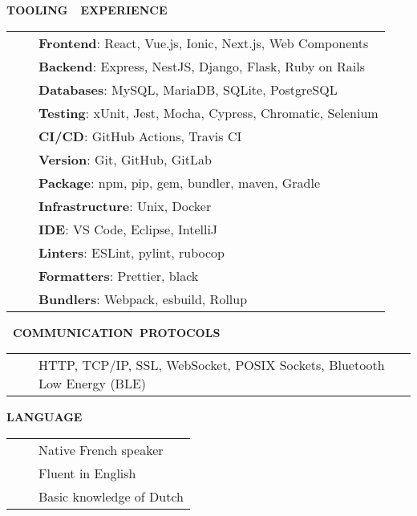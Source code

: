 \documentclass[a4paper,11pt,english]{article}
\newcommand{\LeftColumn}[0]{6.0cm}
\newcommand{\ToolCategory}[1]{\textbf{#1}}
\newcommand{\Bullet}[0]{\faCaretRight~~}
\newcommand{\Rubric}[1]{\colorbox{gray!20}{\parbox{\linewidth}{\centering\sffamily\bfseries{}#1}}}
\begin{document}
\begin{minipage}[t]{\LeftColumn}

\Rubric{\faTools \quad TOOLING~~EXPERIENCE}\vspace{8pt}

\begin{tabularx}{\linewidth}{@{}l@{}>{\raggedright\arraybackslash}X@{}}
\Bullet & \ToolCategory{Frontend}: React, Vue.js, Ionic, Next.js, Web Components \\[0pt]
\Bullet & \ToolCategory{Backend}: Express, NestJS, Django, Flask, Ruby on Rails \\[0pt]
\Bullet & \ToolCategory{Databases}: MySQL, MariaDB, SQLite, PostgreSQL \\[0pt]
\Bullet & \ToolCategory{Testing}: xUnit, Jest, Mocha, Cypress, Chromatic, Selenium \\[0pt]
\Bullet & \ToolCategory{CI/CD}:  GitHub Actions, Travis CI \\[0pt]
\Bullet & \ToolCategory{Version}: Git, GitHub, GitLab \\[0pt]
\Bullet & \ToolCategory{Package}: npm, pip, gem, bundler, maven, Gradle \\[0pt]
\Bullet & \ToolCategory{Infrastructure}: Unix, Docker \\[0pt]
\Bullet & \ToolCategory{IDE}: VS Code, Eclipse, IntelliJ \\[0pt]
\Bullet & \ToolCategory{Linters}: ESLint, pylint, rubocop \\[0pt]
\Bullet & \ToolCategory{Formatters}: Prettier, black \\[0pt]
\Bullet & \ToolCategory{Bundlers}: Webpack, esbuild, Rollup \\[0pt]
\end{tabularx}

\vspace{12pt}\Rubric{\faNetworkWired~COMMUNICATION~PROTOCOLS}\vspace{8pt}

\begin{tabularx}{\linewidth}{@{}l@{}>{\raggedright\arraybackslash}X@{}}
\Bullet & HTTP, TCP/IP, SSL, WebSocket, POSIX Sockets, Bluetooth Low Energy (BLE) \\[0pt]
\end{tabularx}

\vspace{12pt}\Rubric{\faLanguage \quad LANGUAGE}\vspace{8pt}

\begin{tabularx}{\linewidth}{@{}l@{}l@{}}
\Bullet & Native French speaker \\[0pt]
\Bullet & Fluent in English \\[0pt]
\Bullet & Basic knowledge of Dutch \\[0pt]
\end{tabularx}


\end{minipage}
\end{document}
